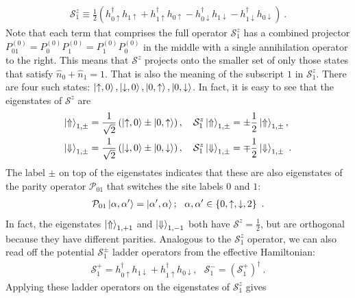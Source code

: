 \begin{eqnarray}
	\mathcal{S}^z_1 \equiv \frac{1}{2}\left(h^\dagger_{0 \uparrow} h_{1 \uparrow}+ h^\dagger_{1 \uparrow} h_{0 \uparrow} - h^\dagger_{0 \downarrow} h_{1 \downarrow} - h^\dagger_{1 \downarrow} h_{0 \downarrow}\right)~.
\end{eqnarray}
Note that each term that comprises the full operator \(\mathcal{S}^z_1\) has a combined projector \(P_{01}^{(0)} = P_0^{(0)}P_1^{(0)} = P_1^{(0)}P_0^{(0)}\) in the middle with a single annihilation operator to the right. This means that \(\mathcal{S}^z\) projects onto the smaller set of only those states that satisfy \(\hat n_0 + \hat n_1 = 1\). That is also the meaning of the subscript \(1\) in \(\mathcal{S}^z_1\). There are four such states: \(\ket{\uparrow, 0}, \ket{\downarrow,0}, \ket{0,\uparrow}, \ket{0, \downarrow}\). In fact, it is easy to see that the eigenstates of \(\mathcal{S}^z\) are
\begin{eqnarray}
	\label{sigmaz-def}
	\ket{\Uparrow}_{1,\pm} &= \frac{1}{\sqrt 2}\left(\ket{\uparrow,0} \pm \ket{0, \uparrow}\right), \quad \mathcal{S}^z_1\ket{\Uparrow}_{1,\pm} = \pm\frac{1}{2}\ket{\Uparrow}_{1,\pm}, \\
	\ket{\Downarrow}_{1,\pm} &= \frac{1}{\sqrt 2}\left( \ket{\downarrow, 0} \pm \ket{0, \downarrow}\right),\quad \mathcal{S}^z_1\ket{\Downarrow}_{1,\pm} = \mp\frac{1}{2}\ket{\Downarrow}_{1,\pm}~.
\end{eqnarray}
The label \(\pm\) on top of the eigenstates indicates that these are also eigenstates of the parity operator \(\mathcal{P}_{01}\) that switches the site labels \(0\) and \(1\):
\begin{eqnarray}
	\label{parity-define}
	\mathcal{P}_{01}\ket{\alpha,\alpha^\prime} = \ket{\alpha^\prime,\alpha};~~ \alpha,\alpha^\prime \in \left\{0,\uparrow,\downarrow,2\right\} ~.
\end{eqnarray}
In fact, the eigenstates \(\ket{\Uparrow}_{1,+1}\) and \(\ket{\Downarrow}_{1,-1}\) both have \(\mathcal{S}^z = \frac{1}{2}\), but are orthogonal because they have different parities. Analogous to the \(\mathcal{S}_1^z\) operator, we can also read off the potential \(\mathcal{S}_1^\pm\) ladder operators from the effective Hamiltonian:
\begin{eqnarray}
	\label{sigmapm-def}
	\mathcal{S}_1^+ = h^\dagger_{0 \uparrow} h_{1 \downarrow} + h^\dagger_{1 \uparrow} h_{0 \downarrow}, ~ ~ ~\mathcal{S}_1^- = \left(\mathcal{S}_1^+\right)^\dagger~.
\end{eqnarray}
Applying these ladder operators on the eigenstates of \(\mathcal{S}_1^z\) gives
